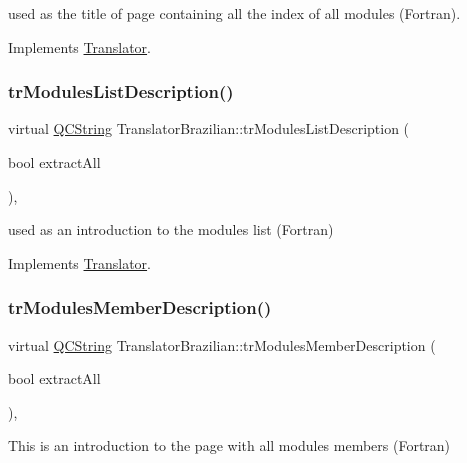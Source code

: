 used as the title of page containing all the index of all modules (Fortran). 

Implements \mbox{\hyperlink{class_translator}{Translator}}.

\mbox{\label{class_translator_brazilian_a5a5f392790289d6c5d4bccf6fc6f303f}} 
\subsubsection{\texorpdfstring{trModulesListDescription()}{trModulesListDescription()}}
{\footnotesize\ttfamily virtual \mbox{\hyperlink{class_q_c_string}{Q\+C\+String}} Translator\+Brazilian\+::tr\+Modules\+List\+Description (\begin{DoxyParamCaption}\item[{bool}]{extract\+All }\end{DoxyParamCaption})\hspace{0.3cm}{\ttfamily [inline]}, {\ttfamily [virtual]}}

used as an introduction to the modules list (Fortran) 

Implements \mbox{\hyperlink{class_translator}{Translator}}.

\mbox{\label{class_translator_brazilian_a4f3e34a68cc8ed6d24056413f03d993c}} 
\subsubsection{\texorpdfstring{trModulesMemberDescription()}{trModulesMemberDescription()}}
{\footnotesize\ttfamily virtual \mbox{\hyperlink{class_q_c_string}{Q\+C\+String}} Translator\+Brazilian\+::tr\+Modules\+Member\+Description (\begin{DoxyParamCaption}\item[{bool}]{extract\+All }\end{DoxyParamCaption})\hspace{0.3cm}{\ttfamily [inline]}, {\ttfamily [virtual]}}

This is an introduction to the page with all modules members (Fortran) 

